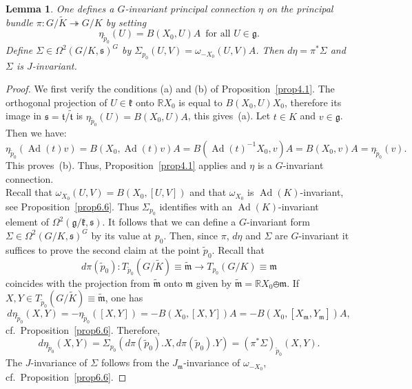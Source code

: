 \documentclass[a4paper,reqno]{amsart}
\newtheorem{lem}[thm]{Lemma}
\theoremstyle{definition}
\theoremstyle{remark}
\theoremstyle{plain}
\numberwithin{equation}{section}
\newcommand{\R}{{\mathbb{R}}}
\newcommand{\g}{{\mathfrak{g}}}  %
\newcommand{\fm}{{\mathfrak{m}}}
\newcommand{\fk}{{\mathfrak{k}}}  \renewcommand{\k}{{\mathfrak{k}}}
\newcommand{\fz}{{\mathfrak{z}}}
\newcommand{\fs}{{\mathfrak{s}}}
\newcommand{\ft}{{\mathfrak{t}}}
\newcommand{\sto}{\twoheadrightarrow}
\DeclareMathOperator{\Ad}{{Ad}}
\newcommand{\Kt}{{\widetilde{K}}}
\newcommand{\wt}{{\widetilde{\mathfrak{t}}}}
\newcommand{\wm}{{\widetilde{\mathfrak{m}}}}
\newcommand{\wpzero}{{\tilde{p}_0}}
\begin{document}
 \begin{lem}
   \label{lem4.2}
  One defines a $G$-invariant principal connection $\eta$ on the principal
  bundle $\pi : G/\Kt  \sto  G/K$ by setting
\[
  \eta_{\wpzero}(U) = B(X_0,U) A \ \; \text{for all $U \in \g$.}
\]
Define $\Sigma \in \Omega^2(G/K,\fs)^G$ by $\Sigma_{p_0}(U,V) = 
\omega_{-X_0}(U,V) A$.  %
 Then
 $d\eta  = \pi^*\Sigma$ and $\Sigma$ is $J$-invariant.
 \end{lem}


 \begin{proof}
   We first verify the conditions (a) and (b) of
   Proposition~\ref{prop4.1}. The orthogonal projection of
   $U \in \fk$ onto $\R X_0$ is equal to $B(X_0,U) X_0$,
   therefore its image in $\fs = \ft/\wt$ is
   $\eta_{\wpzero}(U) = B(X_0,U) A$, this gives~(a). Let
   $t \in K$ and $v \in \g$. Then we have:
$$
\eta_{\wpzero}(\Ad(t)v) = B(X_0,\Ad(t)v) A =
   B(\Ad(t)^{-1}X_0,v) A = B(X_0,v) A =
   \eta_{\wpzero}(v).
$$
   This proves~(b). Thus, Proposition~\ref{prop4.1} applies and $\eta$ is a
   $G$-invariant connection.
   \\
   Recall that $\omega_{X_0}(U,V) = B(X_0,[U,V])$ and that
   $\omega_{X_0}$ is $\Ad(K)$-invariant, see
   Proposition~\ref{prop6.6}. Thus $\Sigma_{p_0}$ identifies
   with an $\Ad(K)$-invariant element of
   $\Omega^2(\g/\fk,\fs)$. It follows that we can define a
   $G$-invariant form $\Sigma \in \Omega^2(G/K,\fs)^G$ by its
   value at $p_0$.  Then, since $\pi$, $d\eta$ and $\Sigma$
   are $G$-invariant it suffices to prove the second claim
   at the point $\wpzero$. Recall that
   $$d\pi({\wpzero}) : T_{\wpzero} (G/\Kt) \equiv \wm \to T_{p_0}
  ( G/K)\equiv \fm$$
  coincides with the projection from $\wm$
   onto $\fm$ given by $\wm = \R X_0 \obot \fm$. If
   $X,Y \in T_{\wpzero} (G/\Kt) \equiv \wm$, one has
 \[
d\eta_{\wpzero}(X,Y)= - \eta_{\wpzero}([X,Y]) = -B(X_0,[X,Y])A = -
B(X_0,[X_\fm,Y_\fm]) A,
\]
cf.~Proposition~\ref{prop6.6}. Therefore,
\[
d\eta_{\wpzero}(X,Y)= \Sigma_{p_0}(d\pi({\wpzero}).X,
d\pi({\wpzero}).Y) = (\pi^*\Sigma)_{\wpzero}(X,Y). 
\]
The $J$-invariance of $\Sigma$ follows from the
$J_\fm$-invariance of $\omega_{-X_0}$, cf.~Proposition~\ref{prop6.6}.
 \end{proof}
\end{document}
